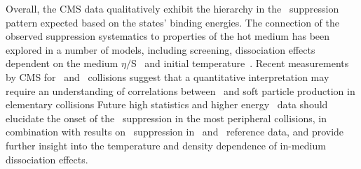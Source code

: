 Overall, the CMS data qualitatively exhibit the hierarchy in the \PgUn\ suppression pattern
expected based on the states' binding energies. The connection of the observed suppression
systematics to properties of the hot medium has been explored in a number of models,
including screening, dissociation effects dependent on the medium $\eta/$S~\cite{Strickland:2012as}
and initial temperature~\cite{Ganesh:2014lha}. Recent measurements by CMS for
\pp\ and \pPb\ collisions suggest that a quantitative interpretation may require an understanding of correlations
between \PgUn\ and soft particle production in elementary collisions \cite{Chatrchyan:2013nza}
Future high statistics and higher energy \PbPb\ data should elucidate the onset of the \PgU\ suppression in the most
peripheral collisions, in combination with results on \PgU\ suppression in \pp\ and \pPb\
reference data, and provide further insight into the temperature and density dependence
of in-medium dissociation effects.
